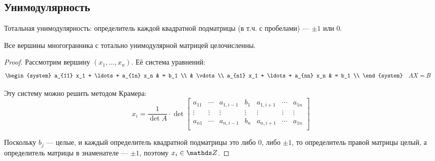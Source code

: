 \subsection{Унимодулярность}
Тотальная унимодулярность:
определитель каждой квадратной подматрицы
(в т.ч. с пробелами) --- $\pm 1$ или $0$.
\begin{theorem}
    Все вершины многогранника с тотально унимодулярной
    матрицей целочисленны.
\end{theorem}
\begin{proof}
    Рассмотрим вершину $(x_1, \ldots, x_n)$.
    Её система уравнений:
    \begin{align*}
        &
        \begin{system}
            a_{11} x_1 + \ldots + a_{1n} x_n & = b_1 \\
            & \vdots \\
            a_{n1} x_1 + \ldots + a_{nn} x_n & = b_1 \\
        \end{system}
        &&
        A X = B
    \end{align*}

    Эту систему можно решить методом Крамера:
    \[
        x_i = \frac{1}{\det A} \cdot \det
        \begin{bmatrix}
            a_{11} & \cdots & a_{1,i - 1} & b_1 & a_{1,i + 1} & \cdots & a_{1n} \\
            \vdots & \vdots & \vdots & \vdots & \vdots & \vdots & \vdots \\
            a_{n1} & \cdots & a_{n,i - 1} & b_n & a_{n,i + 1} & \cdots & a_{1n} \\
        \end{bmatrix}
    \]

    Поскольку $b_j$ --- целые, и каждый определитель
    квадратной подматрицы это либо $0$, либо $\pm 1$,
    то определитель правой матрицы целый,
    а определитель матрицы в знаменателе --- $\pm 1$,
    поэтому $x_i \in \Z$.
\end{proof}
